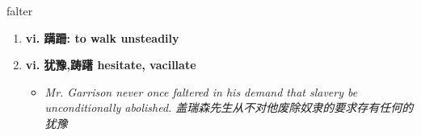 
\begin{frame}
{\huge falter}
\begin{center}
\begin{enumerate}\Large
  \item \textbf{vi. 蹒跚: to walk unsteadily}
  \item \textbf{vi. 犹豫,踌躇 hesitate, vacillate}
  \begin{itemize}
    \item \em{\Large{Mr. Garrison never once faltered in his demand that slavery be unconditionally abolished. 盖瑞森先生从不对他废除奴隶的要求存有任何的犹豫}}
  \end{itemize}
\end{enumerate}
\end{center}
\end{frame}

